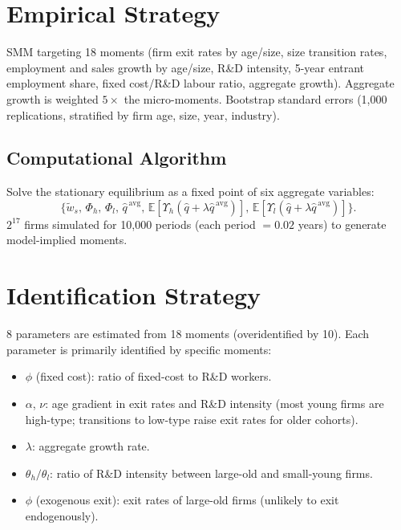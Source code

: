 \section{Empirical Strategy}

SMM targeting 18 moments (firm exit rates by age/size, size transition
rates, employment and sales growth by age/size, R\&D intensity,
5-year entrant employment share, fixed cost/R\&D labour ratio, aggregate
growth). Aggregate growth is weighted $5\times$ the micro-moments.
Bootstrap standard errors (1,000 replications, stratified by firm age,
size, year, industry).

\subsection*{Computational Algorithm}

Solve the stationary equilibrium as a fixed point of six aggregate
variables:
\begin{equation}
  \{\tilde{w}_s,\,\Phi_h,\,\Phi_l,\,\hat{q}^{\,\text{avg}},\,
  \mathbb{E}[\Upsilon_h(\hat{q}+\lambda\hat{q}^{\,\text{avg}})],\,
  \mathbb{E}[\Upsilon_l(\hat{q}+\lambda\hat{q}^{\,\text{avg}})]\}.
  \label{eq:ace_fp}
\end{equation}
$2^{17}$ firms simulated for 10,000 periods (each period $= 0.02$ years)
to generate model-implied moments.

\section{Identification Strategy}

8 parameters are estimated from 18 moments (overidentified by 10). Each
parameter is primarily identified by specific moments:
\begin{itemize}
  \item $\phi$ (fixed cost): ratio of fixed-cost to R\&D workers.
  \item $\alpha$, $\nu$: age gradient in exit rates and R\&D intensity
    (most young firms are high-type; transitions to low-type raise exit
    rates for older cohorts).
  \item $\lambda$: aggregate growth rate.
  \item $\theta_h/\theta_l$: ratio of R\&D intensity between large-old
    and small-young firms.
  \item $\phi$ (exogenous exit): exit rates of large-old firms (unlikely
    to exit endogenously).
\end{itemize}

